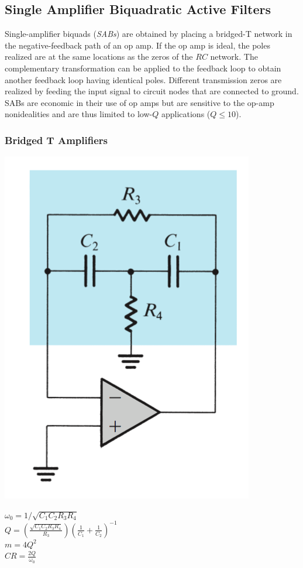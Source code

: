 \documentclass[11pt]{article}
\begin{document}
    \subsection{Single Amplifier Biquadratic Active Filters}

    Single-amplifier biquads (\textit{SABs}) are obtained by placing a bridged-T network in the negative-feedback path of an op amp. If the op amp is ideal, the poles realized are at the same locations as the zeros of the $RC$ network. The complementary transformation can be applied to the feedback loop to obtain another feedback loop having identical poles. Different transmission zeros are realized by feeding the input signal to circuit nodes that are connected to ground. SABs are economic in their use of op amps but are sensitive to the op-amp nonidealities and
    are thus limited to low-$Q$ applications ($Q \leq 10$).

    \subsubsection{Bridged T Amplifiers}

    \begin{center}
        \includegraphics[width=200 px]{bridge-t} 
    \end{center}

    $\omega_0 = 1/\sqrt{C_1C_2R_3R_4}$ \\
    
    $Q = (\frac{\sqrt{C_1C_2R_3R_4}}{R_3})(\frac{1}{C_1}+\frac{1}{C_2})^{-1}$ \\
    
    $m = 4Q^2$ \\
    
    $CR = \frac{2Q}{\omega_0}$ \\
\end{document}
